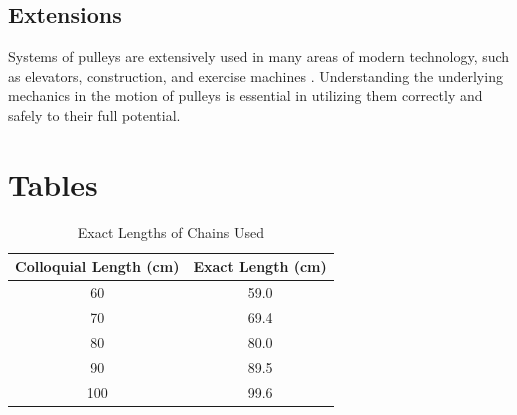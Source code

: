 \documentclass[stu,biblatex,floatsintext,draftall]{apa7}
\begin{document}
\subsection{Extensions}
Systems of pulleys are extensively used in many areas of modern technology, such as elevators, construction, and exercise machines \parencite{Vork2018PulleyExamples}. Understanding the underlying mechanics in the motion of pulleys is essential in utilizing them correctly and safely to their full potential.

\printbibliography

\appendix

\section{Tables}

\begin{table}
	\centering
	\caption{Exact Lengths of Chains Used}
	\label{tab:exact-lengths}
	\begin{tabular}{|c|c|}
		\hline
    	Colloquial Length (\unit{\centi\meter}) & Exact Length (\unit{\centi\meter}) \\
		\hline
		60 & 59.0 \\
		\hline
		70 & 69.4 \\
		\hline
		80 & 80.0 \\
		\hline
		90 & 89.5 \\
		\hline
		100 & 99.6 \\
		\hline
    \end{tabular}
\end{table}
\end{document}
